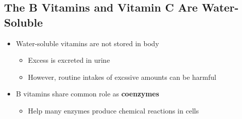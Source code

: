 \documentclass[12pt]{article}
\begin{document}
        \subsection{The B Vitamins and Vitamin C Are Water-Soluble}
            \begin{itemize}
                \item Water-soluble vitamins are not stored in body
                    \begin{itemize}
                        \item Excess is excreted in urine
                        \item However, routine intakes of excssive amounts can be harmful
                    \end{itemize}
                \item B vitamins share common role as \textbf{coenzymes}
                    \begin{itemize}
                        \item Help many enzymes produce chemical reactions in cells
                    \end{itemize}
            \end{itemize}
\end{document}
